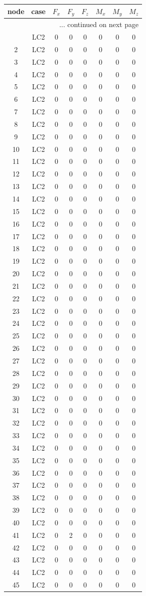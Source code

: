 \documentclass{article}%
\begin{document}
\begin{longtable}{| c c | c c c c c c |}%
\hline%
node&case&$F_x$&$F_y$&$F_z$&$M_x$&$M_y$&$M_z$\\%
\hline%
\endhead%
\hline%
\multicolumn{8}{r}{... continued on next page}\\%
\endfoot%
\hline%
\endlastfoot%
1&LC2&0&0&0&0&0&0\\%
2&LC2&0&0&0&0&0&0\\%
3&LC2&0&0&0&0&0&0\\%
4&LC2&0&0&0&0&0&0\\%
5&LC2&0&0&0&0&0&0\\%
6&LC2&0&0&0&0&0&0\\%
7&LC2&0&0&0&0&0&0\\%
8&LC2&0&0&0&0&0&0\\%
9&LC2&0&0&0&0&0&0\\%
10&LC2&0&0&0&0&0&0\\%
11&LC2&0&0&0&0&0&0\\%
12&LC2&0&0&0&0&0&0\\%
13&LC2&0&0&0&0&0&0\\%
14&LC2&0&0&0&0&0&0\\%
15&LC2&0&0&0&0&0&0\\%
16&LC2&0&0&0&0&0&0\\%
17&LC2&0&0&0&0&0&0\\%
18&LC2&0&0&0&0&0&0\\%
19&LC2&0&0&0&0&0&0\\%
20&LC2&0&0&0&0&0&0\\%
21&LC2&0&0&0&0&0&0\\%
22&LC2&0&0&0&0&0&0\\%
23&LC2&0&0&0&0&0&0\\%
24&LC2&0&0&0&0&0&0\\%
25&LC2&0&0&0&0&0&0\\%
26&LC2&0&0&0&0&0&0\\%
27&LC2&0&0&0&0&0&0\\%
28&LC2&0&0&0&0&0&0\\%
29&LC2&0&0&0&0&0&0\\%
30&LC2&0&0&0&0&0&0\\%
31&LC2&0&0&0&0&0&0\\%
32&LC2&0&0&0&0&0&0\\%
33&LC2&0&0&0&0&0&0\\%
34&LC2&0&0&0&0&0&0\\%
35&LC2&0&0&0&0&0&0\\%
36&LC2&0&0&0&0&0&0\\%
37&LC2&0&0&0&0&0&0\\%
38&LC2&0&0&0&0&0&0\\%
39&LC2&0&0&0&0&0&0\\%
40&LC2&0&0&0&0&0&0\\%
41&LC2&0&2&0&0&0&0\\%
42&LC2&0&0&0&0&0&0\\%
43&LC2&0&0&0&0&0&0\\%
44&LC2&0&0&0&0&0&0\\%
45&LC2&0&0&0&0&0&0\\%
\end{longtable}%
\end{document}
